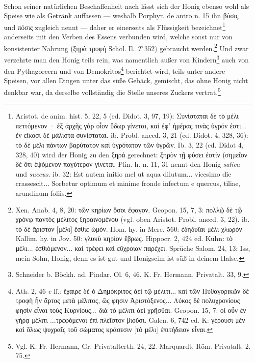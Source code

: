 \documentclass[a4paper, 11pt, oneside]{article}
\begin{document}
\paragraph{}
Schon seiner natürlichen Beschaffenheit nach lässt sich der Honig ebenso wohl als Speise wie als Getränk auffassen --- weshalb Porphyr. de antro n. 15 ihn βόσις und πόσις zugleich nennt --- daher er einerseits als Flüssigkeit bezeichnet\footnote{Aristot. de anim. hist. 5, 22, 5 (ed. Didot. 3, 97, 19): Συνίσταται δὲ τὸ μέλι πεττόμενον · ἐξ ἀρχῆς γὰρ οἷον ὕδωρ γίνεται, καὶ
ἐφ' ἡμέρας τινὰς ὑγρόν ἐστι... ἐν εἴκοσι δὲ μάλιστα συνίσταται. ib. Probl. anecd. 3, 21 (ed. Didot. 4, 328, 36): τὸ δὲ μέλι πάντων βαρύτατον καὶ ὑγρότατον τῶν ὑγρῶν. Ib. 3, 22 (ed. Didot 4, 328, 40) wird der Honig zu den ξηρά gerechnet: ξηρὸν τῇ φύσει ἐστίν (σημεῖον δὲ ὅτι ἑψόμενον παγύτερον γίνεται. Plin. h. n. 11, 31 nennt den Honig \emph{saliva} und \emph{succus}. ib. 32: Est autem initio mel ut aqua dilutum... vicesimo die crassescit... Sorbetur optimum et minime fronde infectum e quercus, tiliae, arundinum foliis.} anderseits mit den Verben des Essens verbunden wird, welche sonst nur von konsistenter Nahrung (ξηρὰ τροφή Schol. Il. \emph{T} 352) gebraucht werden.\footnote{Xen. Anab. 4, 8, 20: τῶν κηρίων ὅσοι ἔφαγον. Geopon. 15, 7, 3: πολλῷ δὲ τῷ χρόνῳ παντὸς μέλιτος ξηραινομένου (vgl. oben Aristot. Probl. anecd. 3, 22). ib. τὸ δὲ ἄριστον [μέλι] ἔσθιε ὠμόν. Hom. hy. in Merc. 560: ἐδηδυῖαι μέλι χλωρόν Kallim. hy. in Jov. 50: γλυκὺ κηρίον ἔβρως. Hippocr. 2, 424 ed. Kühn: τὸ μέλι... ἐσθιόμενον... καὶ τρέφει καὶ εὔχροιαν παρέχει. Sprüche Salom. 24, 13: Iss, mein Sohn, Honig, denn es ist gut und Honigseim ist süß in deinem Halse.} Und zwar verzehrte man den Honig teils rein, was namentlich außer von Kindern\footnote{Schneider b. Böckh. ad. Pindar. Ol. 6, 46. K. Fr. Hermann, Privatalt. 33, 9.} auch von den Pythagoreern und von Demokritos\footnote{Ath. 2, 46 \emph{e} ff.: ἔχαιρε δὲ ὁ Δημόκριτος ἀεὶ τῷ μέλιτι... καὶ τῶν Πυθαγορικῶν δὲ τροφὴ ἦν ἄρτος μετὰ μέλιτος, ὥς φησιν Ἀριστόξενος... Λύκος δὲ πολυχρονίους φησὶν εἶναι τοὺς Κυρνίους... διὰ τὸ μέλιτι ἀεὶ χρῆσθαι. Geopon. 15, 7: οἱ οὖν ἐν γήρᾳ μέλιτι ...τρεφόμενοι ἐπὶ πλεῖστον βιοῦσι. Galen. 6, 742 ed. K: γέρουσι μὲν καὶ ὅλως ψυχραῖς τοῦ σώματος κράσεσιν [τὸ μέλι] ἐπιτήδειον εἶναι.} berichtet wird, teils unter andere Speisen, vor allen Dingen unter das süße Gebäck, gemischt, das ohne Honig nicht denkbar war, da derselbe vollständig die Stelle unseres Zuckers vertrat.\footnote{Vgl. K. Fr. Hermann, Gr. Privatalterth. 24, 22. Marquardt, Röm. Privatalt. 2, 75.}
\end{document}
